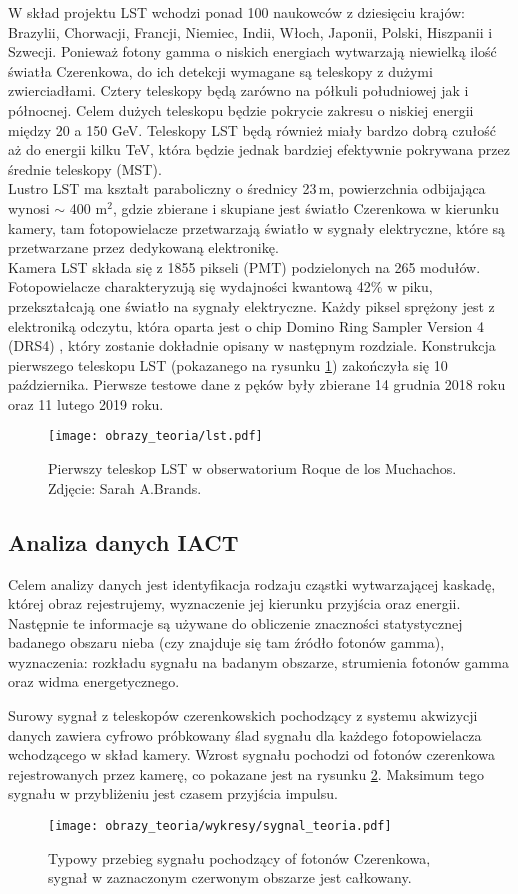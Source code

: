 \documentclass[a4paper,11pt,twoside]{article}
\begin{document}
W skład projektu LST wchodzi ponad 100 naukowców z dziesięciu krajów: Brazylii, Chorwacji, Francji, Niemiec, Indii, Włoch, Japonii, Polski, Hiszpanii i Szwecji. Ponieważ fotony gamma o niskich energiach wytwarzają niewielką ilość światła Czerenkowa, do ich detekcji wymagane są teleskopy z dużymi zwierciadłami. Cztery teleskopy będą zarówno na półkuli południowej jak i północnej. Celem dużych teleskopu będzie pokrycie zakresu o niskiej energii między 20 a 150 GeV. Teleskopy LST będą również miały bardzo dobrą czułość aż do energii kilku TeV, która będzie jednak bardziej efektywnie pokrywana przez średnie teleskopy (MST). \\
Lustro LST ma kształt paraboliczny o średnicy 23\,m, powierzchnia odbijająca wynosi $\sim$ 400 m$^2$, gdzie zbierane i skupiane jest światło Czerenkowa w kierunku kamery, tam fotopowielacze przetwarzają światło w sygnały elektryczne, które są przetwarzane przez dedykowaną elektronikę. \\
Kamera LST składa się z 1855 pikseli (PMT) podzielonych na 265 modułów. Fotopowielacze charakteryzują się  wydajności kwantową 42\% w piku, przekształcają one światło na sygnały elektryczne. Każdy piksel sprężony jest z elektroniką odczytu, która oparta jest o chip Domino Ring Sampler Version 4 (DRS4) \cite{cta_web}, który zostanie dokładnie opisany w następnym rozdziale. Konstrukcja pierwszego teleskopu LST (pokazanego na rysunku \ref{fig:lst}) zakończyła się 10 października. Pierwsze testowe dane z pęków były zbierane 14 grudnia 2018 roku oraz 11 lutego 2019 roku.
\begin{figure}[H] 
\centering
\texttt{[image: obrazy\_teoria/lst.pdf]}
\caption{Pierwszy teleskop LST w obserwatorium Roque de los Muchachos. Zdjęcie: Sarah A.Brands.}
\label{fig:lst}
\end{figure}
\subsection{Analiza danych IACT}
Celem analizy danych jest identyfikacja rodzaju cząstki wytwarzającej  kaskadę, której obraz rejestrujemy, wyznaczenie jej kierunku przyjścia oraz energii. Następnie te informacje są używane do obliczenie znaczności statystycznej badanego obszaru nieba (czy znajduje się tam źródło fotonów gamma), wyznaczenia: rozkładu sygnału na badanym obszarze, strumienia fotonów gamma oraz widma energetycznego. 

Surowy sygnał z teleskopów czerenkowskich pochodzący z systemu akwizycji danych zawiera cyfrowo próbkowany ślad sygnału dla każdego fotopowielacza wchodzącego w skład kamery. Wzrost sygnału pochodzi od fotonów czerenkowa rejestrowanych przez kamerę, co pokazane jest na rysunku \ref{fig:signal_theory}.
 Maksimum tego sygnału w przybliżeniu jest czasem przyjścia impulsu.
\begin{figure}[H] 
\centering
\texttt{[image: obrazy\_teoria/wykresy/sygnal\_teoria.pdf]}
\caption{Typowy przebieg sygnału pochodzący of fotonów Czerenkowa, sygnał w zaznaczonym czerwonym obszarze jest całkowany.}
\label{fig:signal_theory}
\end{figure}
\end{document}
